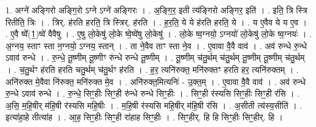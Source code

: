 \documentclass[17pt]{extarticle}
\begin{document}
1. अग्ने॑ अङ्गिरो अङ्गि॒रो ऽग्ने ऽग्ने॑ अङ्गिरः । . अ॒ङ्गि॒र॒ इती त्य॑ङ्गिरो अङ्गिर॒ इति॑ । . इति॒ त्रि स्त्रि रितीति॒ त्रिः । . त्रिर्. ह॑रति हरति॒ त्रि स्त्रिर्. ह॑रति । . ह॒र॒ति॒ ये ये ह॑रति हरति॒ ये । . य ए॒वैव ये य ए॒व । . ए॒वै ष्वे᳚(1॒)ष्वे॑ वैवैषु । . ए॒षु लो॒केषु॑ लो॒के ष्वे॒ष्वे॑षु लो॒केषु॑ । . लो॒के ष्व॒ग्नयो॒ ऽग्नयो॑ लो॒केषु॑ लो॒के ष्व॒ग्नयः॑ । . अ॒ग्नय॒ स्ताꣳ स्ता न॒ग्नयो॒ ऽग्नय॒ स्तान् । . ता ने॒वैव ताꣳ स्ता ने॒व । . ए॒वावा वै॒वै वाव॑ । . अव॑ रुन्धे रु॒न्धे ऽवाव॑ रुन्धे । . रु॒न्धे॒ तू॒ष्णीम् तू॒ष्णीꣳ रु॑न्धे रुन्धे तू॒ष्णीम् । . तू॒ष्णीम् च॑तु॒र्थम् च॑तु॒र्थम् तू॒ष्णीम् तू॒ष्णीम् च॑तु॒र्थम् । . च॒तु॒र्थꣳ ह॑रति हरति चतु॒र्थम् च॑तु॒र्थꣳ ह॑रति । . ह॒र॒ त्यनि॑रुक्त॒ मनि॑रुक्तꣳ हरति हर॒ त्यनि॑रुक्तम् । . अनि॑रुक्त मे॒वैवा नि॑रुक्त॒ मनि॑रुक्त मे॒व । . अनि॑रुक्त॒मित्यनिः॑ - उ॒क्त॒म् । . ए॒वावा वै॒वै वाव॑ । . अव॑ रुन्धे रु॒न्धे ऽवाव॑ रुन्धे । . रु॒न्धे॒ सिꣳ॒॒हीः सिꣳ॒॒ही रु॑न्धे रुन्धे सिꣳ॒॒हीः । . सिꣳ॒॒ही र॑स्यसि सिꣳ॒॒हीः सिꣳ॒॒ही र॑सि । . अ॒सि॒ म॒हि॒षीर् म॑हि॒षी र॑स्यसि महि॒षीः । . म॒हि॒षी र॑स्यसि महि॒षीर् म॑हि॒षी र॑सि । . अ॒सीती त्य॑स्य॒सीति॑ । . इत्या॑हा॒हे तीत्या॑ह । . आ॒ह॒ सिꣳ॒॒हीः सिꣳ॒॒ही रा॑हाह सिꣳ॒॒हीः । . सिꣳ॒॒हीर्. हि हि सिꣳ॒॒हीः सिꣳ॒॒हीर्. हि । \newline
\end{document}
